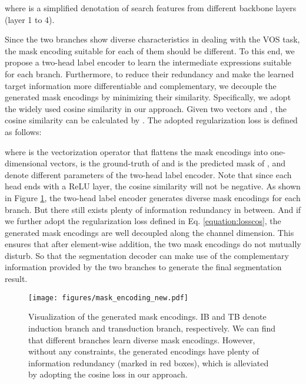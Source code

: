 \documentclass[10pt,twocolumn,letterpaper]{article}
\begin{document}
where  is a simplified denotation of search features from different backbone layers (layer 1 to 4).

Since the two branches show diverse characteristics in dealing with the VOS task, the mask encoding suitable for each of them should be different. To this end, we propose a two-head label encoder to learn the intermediate expressions suitable for each branch. Furthermore, to reduce their redundancy and make the learned target information more differentiable and complementary, we decouple the generated mask encodings by minimizing their similarity. Specifically, we adopt the widely used cosine similarity in our approach. Given two vectors  and , the cosine similarity can be calculated by . The adopted regularization loss is defined as follows:

where  is the vectorization operator that flattens the mask encodings into one-dimensional vectors,  is the ground-truth of  and  is the predicted mask of ,  and  denote different parameters of the two-head label encoder. Note that since each head ends with a ReLU layer, the cosine similarity will not be negative.
As shown in Figure \ref{fig:mask_enc_show}, the two-head label encoder generates diverse mask encodings for each branch. But there still exists plenty of information redundancy in between. And if we further adopt the regularization loss defined in Eq. \eqref{equation:losscos}, the generated mask encodings are well decoupled along the channel dimension. This ensures that after element-wise addition, the two mask encodings do not mutually disturb. So that the segmentation decoder can make use of the complementary information provided by the two branches to generate the final segmentation result.

\begin{figure}[tbp]
	\begin{center}
\texttt{[image: figures/mask\_encoding\_new.pdf]}
	\vspace{-2.0em}
	\end{center}
	\caption{Visualization of the generated mask encodings. IB and TB denote induction branch and transduction branch, respectively.
We can find that different branches learn diverse mask encodings.
		However, without any constraints, the generated encodings have plenty of information redundancy (marked in red boxes), which is alleviated by adopting the cosine loss in our approach.}
	\label{fig:mask_enc_show}
	\vspace{-0.5em}
\end{figure}
\end{document}
